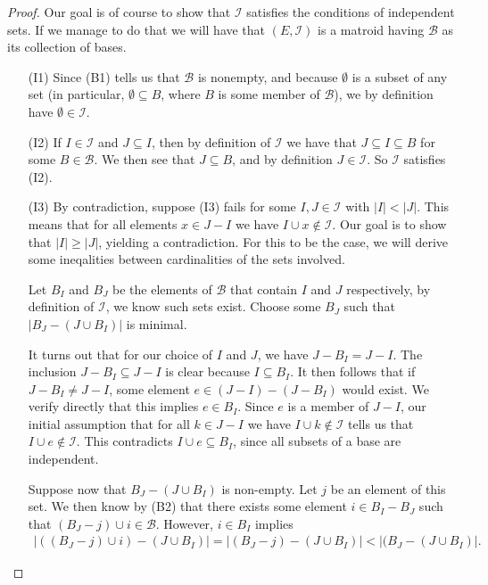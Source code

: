 \begin{proof}
    Our goal is of course to show that $\mathcal{I}$ satisfies the conditions of independent sets. If we manage to do that we will have that $(E, \mathcal{I})$ is a matroid having $\mathcal{B}$ as its collection of bases.
    \begin{enumerate}
      \item[(I1)] Since (B1) tells us that $\mathcal{B}$ is nonempty, and because $\emptyset$ is a subset of any set (in particular, $\emptyset \subseteq B$, where $B$ is some member of $\mathcal{B}$), we by definition have $\emptyset \in \mathcal{I}$.
        
      \item[(I2)] If $I\in\mathcal{I}$ and $J\subseteq I$, then by definition of $\mathcal{I}$ we have that $J\subseteq I\subseteq B$ for some $B\in\mathcal{B}$. We then see that $J\subseteq B$, and by definition  $J\in\mathcal{I}$. So $\mathcal{I}$ satisfies (I2).
        
      \item[(I3)] By contradiction, suppose (I3) fails for some $I,J\in\mathcal{I}$ with $|I|<|J|$. This means that for all elements $x\in J-I$ we have $I\cup x \notin \mathcal{I}$. Our goal is to show that $|I|\geq|J|$, yielding a contradiction. For this to be the case, we will derive some ineqalities between cardinalities of the sets involved.
        
        Let $B_I$ and $B_J$ be the elements of $\mathcal{B}$ that contain $I$ and $J$ respectively, by definition of $\mathcal{I}$, we know such sets exist. Choose some $B_J$ such that $|B_J - (J\cup B_I)|$ is minimal. 

        It turns out that for our choice of $I$ and $J$, we have $J-B_I = J-I$. The inclusion $J- B_I \subseteq J - I$ is clear because $I \subseteq B_I$. It then follows that if $J-B_I \neq J-I$, some element $e \in (J-I)-(J-B_I)$ would exist. We verify directly that this implies $e \in B_I$. Since $e$ is a member of $J-I$, our initial assumption that for all $k \in J - I$ we have $I \cup k \notin \mathcal{I}$ tells us that $I\cup e\notin \mathcal{I}$. This contradicts $I\cup e\subseteq B_I$, since all subsets of a base are independent.

        Suppose now that $B_J-(J\cup B_I)$ is non-empty. Let $j$ be an element of this set. We then know by (B2) that there exists some element $i\in B_I-B_J$ such that $(B_J-j)\cup i \in\mathcal{B}$. However, $i \in B_I$ implies 
        \begin{align*}
        |((B_J-j)\cup i)-(J\cup B_I)|=|(B_J-j)-(J\cup B_I)|<|(B_J-(J\cup B_I)|. 
        \end{align*}


\end{enumerate}
\end{proof}
